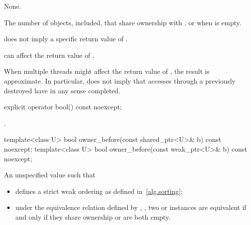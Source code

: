 \begin{itemdescr}
\pnum
\sync
None.

\pnum
\returns
The number of  objects,  included,
that share ownership with , or  when  is
empty.

\pnum
\begin{note}
does not imply a specific return value of .
\end{note}

\pnum
\begin{note}
can affect the return value of .
\end{note}

\pnum
\begin{note}
When multiple threads
might affect the return value of ,
the result is approximate.
In particular,  does not imply that accesses through
a previously destroyed  have in any sense completed.
\end{note}
\end{itemdescr}

%
\begin{itemdecl}
explicit operator bool() const noexcept;
\end{itemdecl}

\begin{itemdescr}
\pnum
\returns
{}.
\end{itemdescr}

%
\begin{itemdecl}
template<class U> bool owner_before(const shared_ptr<U>& b) const noexcept;
template<class U> bool owner_before(const weak_ptr<U>& b) const noexcept;
\end{itemdecl}

\begin{itemdescr}
\pnum
\returns
An unspecified value such that
\begin{itemize}
\item {} defines a strict weak ordering as defined in~\ref{alg.sorting};

\item under the equivalence relation defined by ,
, two  or
 instances are equivalent if and only if they share ownership or
are both empty.
\end{itemize}

\end{itemdescr}

